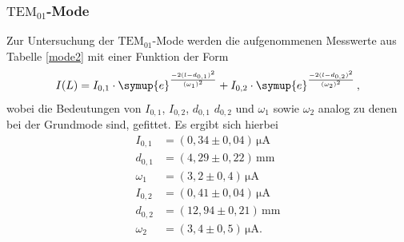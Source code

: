 \subsubsection{$\text{TEM}_{01}$-Mode}
Zur Untersuchung der $\text{TEM}_{01}$-Mode werden die aufgenommenen Messwerte aus Tabelle \ref{mode2} mit einer Funktion der Form
\begin{equation}
  I(L)=I_{0,1}\cdot\symup{e}^{\frac{-2(l-d_{0,1})^2}{(\omega_1)^2}}+I_{0,2}\cdot\symup{e}^{\frac{-2(l-d_{0,2})^2}{(\omega_2)^2}} \, ,
\end{equation}
wobei die Bedeutungen von $I_{0,1}$, $I_{0,2}$, $d_{0,1}$ $d_{0,2}$ und $\omega_1$ sowie $\omega_2$ analog zu denen bei der Grundmode sind, gefittet.
Es ergibt sich hierbei
\begin{align*}
 I_{0,1} &=(0,34 \pm 0,04)\, \si{\micro\ampere}\\
 d_{0,1} &=(4,29 \pm 0,22)\, \si{\milli\meter}\\
\omega_1 &=(3,2 \pm 0,4)\,  \si{\micro\ampere}\\
I_{0,2} &=(0,41 \pm 0,04)\, \si{\micro\ampere}\\
d_{0,2} &=(12,94 \pm 0,21)\, \si{\milli\meter}\\
\omega_2 &=(3,4 \pm 0,5)\,  \si{\micro\ampere}.
\end{align*}

